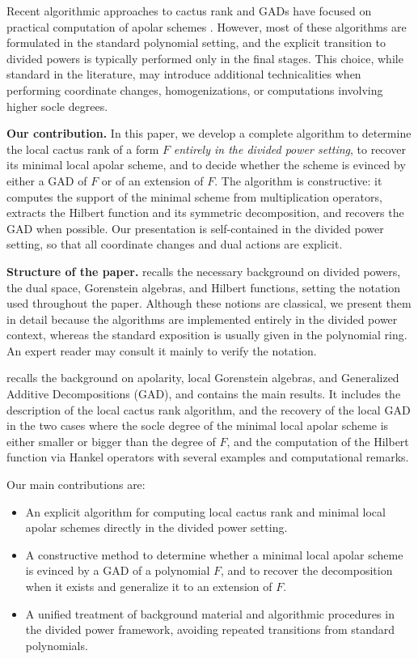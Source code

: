 \documentclass[a4paper,11p]{amsart}
\begin{document}
Recent algorithmic approaches to cactus rank and GADs have focused on practical computation of apolar schemes \cite{Alessandra, GAD}.  
However, most of these algorithms are formulated in the standard polynomial setting, and the explicit transition to divided powers is typically performed only in the final stages.  
This choice, while standard in the literature, may introduce additional technicalities when performing coordinate changes, homogenizations, or computations involving higher socle degrees.

\medskip
\noindent
\textbf{Our contribution.}  
In this paper, we develop a complete algorithm to determine the local cactus rank of a form $F$ \emph{entirely in the divided power setting}, to recover its minimal local apolar scheme, and to decide whether the scheme is evinced by either a GAD of $F$ or of an extension of $F$.  
The algorithm is constructive: it computes the support of the minimal scheme from multiplication operators, extracts the Hilbert function and its symmetric decomposition, and recovers the GAD when possible.  
Our presentation is self-contained in the divided power setting, so that all coordinate changes and dual actions are explicit.

\medskip
\noindent
\textbf{Structure of the paper.}  
 recalls the necessary background on divided powers, the dual space, Gorenstein algebras, and Hilbert functions, setting the notation used throughout the paper.  
Although these notions are classical, we present them in detail because the algorithms are implemented entirely in the divided power context, whereas the standard exposition is usually given in the polynomial ring.   
An expert reader may consult it mainly to verify the notation. 

 recalls the background on apolarity, local Gorenstein algebras, and Generalized Additive Decompositions (GAD), and contains the main results. It includes the description of the local cactus rank algorithm, and the recovery of the local GAD in the two cases where the socle degree of the minimal local apolar scheme is either smaller or bigger than the degree of $F$, and
the computation of the Hilbert function via Hankel operators  with several examples and computational remarks.

Our main contributions are:
\begin{itemize}
    \item An explicit algorithm for computing local cactus rank and minimal local apolar schemes directly in the divided power setting.
    \item A constructive method to determine whether a minimal local apolar scheme is evinced by a GAD of a polynomial $F$, and to recover the decomposition when it exists and generalize it to an extension of $F$.
    \item A unified treatment of background material and algorithmic procedures in the divided power framework, avoiding repeated transitions from standard polynomials.
\end{itemize}
\end{document}
